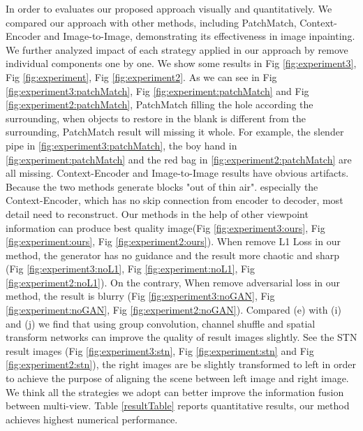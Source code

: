 \documentclass{IEEE_lsens}
\begin{document}
In order to evaluates our proposed approach visually and quantitatively. We compared our approach with other methods, including PatchMatch, Context-Encoder and Image-to-Image, demonstrating its effectiveness in image inpainting. We further analyzed impact of each strategy applied in our approach by remove individual components one by one. We show some results in Fig \ref{fig:experiment3}, Fig \ref{fig:experiment}, Fig \ref{fig:experiment2}. As we can see in Fig \ref{fig:experiment3:patchMatch}, Fig \ref{fig:experiment:patchMatch} and Fig \ref{fig:experiment2:patchMatch}, PatchMatch filling the hole according the surrounding, when objects to restore in the blank is different from the surrounding, PatchMatch result will missing it whole. For example, the slender pipe in \ref{fig:experiment3:patchMatch}, the boy hand in \ref{fig:experiment:patchMatch} and the red bag in \ref{fig:experiment2:patchMatch} are all missing. Context-Encoder and Image-to-Image results have obvious artifacts. Because the two methods generate blocks "out of thin air". especially the Context-Encoder, which has no skip connection from encoder to decoder, most detail need to reconstruct. Our methods in the help of other viewpoint information can produce best quality image(Fig \ref{fig:experiment3:ours}, Fig \ref{fig:experiment:ours}, Fig \ref{fig:experiment2:ours}). When remove L1 Loss in our method, the generator has no guidance and the result more chaotic and sharp (Fig \ref{fig:experiment3:noL1}, Fig \ref{fig:experiment:noL1}, Fig \ref{fig:experiment2:noL1}). On the contrary, When remove adversarial loss in our method, the result is blurry (Fig \ref{fig:experiment3:noGAN}, Fig \ref{fig:experiment:noGAN}, Fig \ref{fig:experiment2:noGAN}). Compared (e) with (i) and (j) we find that using group convolution, channel shuffle and spatial transform networks can improve the quality of result images slightly. See the STN result images (Fig \ref{fig:experiment3:stn}, Fig \ref{fig:experiment:stn} and Fig \ref{fig:experiment2:stn}), the right images are be slightly transformed to left in order to achieve the purpose of aligning the scene between left image and right image. We think all the strategies we adopt can better improve the information fusion between multi-view.
Table \ref{resultTable} reports quantitative results, our method achieves highest numerical performance. 
\end{document}
